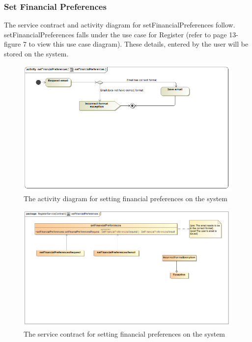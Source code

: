 \documentclass[a4paper,12pt]{report}
\begin{document}
\subsubsection{Set Financial Preferences }
The service contract and activity diagram for setFinancialPreferences follow. setFinancialPreferences falls under the use case for Register (refer to page 13- figure 7 to view this use case diagram). These details, entered by the user will be stored on the system.
\begin{figure}[H]
  \centering
    \includegraphics[width=1.0\textwidth]{../Diagrams/Register/ActivityDiagrams/setFinancialPreferences1.png}
    \caption{The activity diagram for setting financial preferences on the system} 
\end{figure}
\begin{figure}[H]
  \centering
    \includegraphics[width=1.0\textwidth]{../Diagrams/Register/ServiceContractsRegister/setFinancialPreferencesServiceContract.png}
    \caption{The service contract for setting financial preferences on the system} 
\end{figure}
\end{document}
